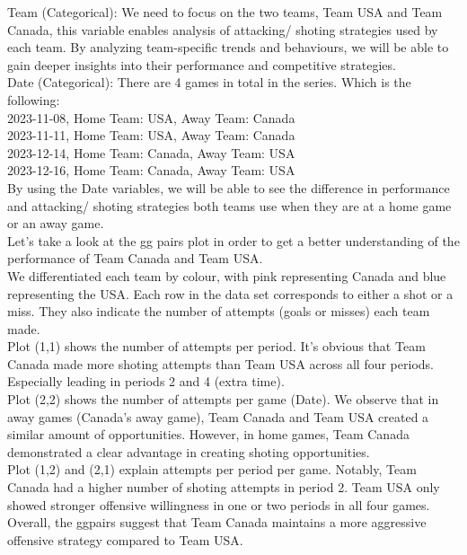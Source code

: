 \documentclass[
  a3paper,
]{article}
\begin{document}
Team (Categorical): We need to focus on the two teams, Team USA and Team
Canada, this variable enables analysis of attacking/ shoting strategies
used by each team. By analyzing team-specific trends and behaviours, we
will be able to gain deeper insights into their performance and
competitive strategies.\\

Date (Categorical): There are 4 games in total in the series. Which is
the following:\\
2023-11-08, Home Team: USA, Away Team: Canada\\
2023-11-11, Home Team: USA, Away Team: Canada\\
2023-12-14, Home Team: Canada, Away Team: USA\\
2023-12-16, Home Team: Canada, Away Team: USA\\

By using the Date variables, we will be able to see the difference in
performance and attacking/ shoting strategies both teams use when they
are at a home game or an away game.\\

Let's take a look at the gg pairs plot in order to get a better
understanding of the performance of Team Canada and Team USA.\\

We differentiated each team by colour, with pink representing Canada and
blue representing the USA. Each row in the data set corresponds to
either a shot or a miss. They also indicate the number of attempts
(goals or misses) each team made.\\

Plot (1,1) shows the number of attempts per period. It's obvious that
Team Canada made more shoting attempts than Team USA across all four
periods. Especially leading in periods 2 and 4 (extra time).\\

Plot (2,2) shows the number of attempts per game (Date). We observe that
in away games (Canada's away game), Team Canada and Team USA created a
similar amount of opportunities. However, in home games, Team Canada
demonstrated a clear advantage in creating shoting opportunities.\\

Plot (1,2) and (2,1) explain attempts per period per game. Notably, Team
Canada had a higher number of shoting attempts in period 2. Team USA
only showed stronger offensive willingness in one or two periods in all
four games. Overall, the ggpairs suggest that Team Canada maintains a
more aggressive offensive strategy compared to Team USA.\\
\end{document}
